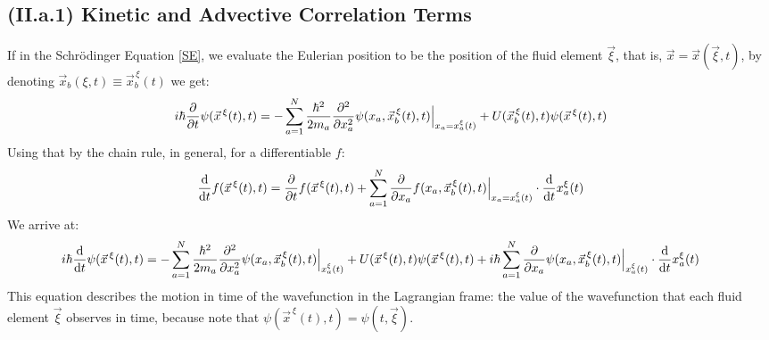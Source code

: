 \documentclass[11pt, a4paper]{article} %
\begin{document}
\subsection*{(II.a.1) Kinetic and Advective Correlation Terms\vspace{-0.2cm}}
If in the Schrödinger Equation \eqref{SE}, we evaluate the Eulerian position to be the position of the fluid element $\vec{\xi}$, that is, $\vec{x}=\vec{x}(\vec{\xi},t)$, by denoting $\vec{x}_b(\xi,t)\equiv \vec{x}_b^{\, \xi}(t)$ we get:
\begin{equation}
i\hbar \pdv{}{t}\psi(\vec{x}^{\, \xi}(t),t)=-\sum_{a=1}^N \frac{\hbar^2}{2m_a}\pdv[2]{}{x_a}\psi(x_a, \vec{x}_b^{\, \xi}(t),t)\Big\rvert_{x_a=x^\xi_a(t)}+U(\vec{x}_b^{\, \xi}(t),t)\psi(\vec{x}^{\, \xi}(t),t)
\end{equation}
Using that by the chain rule, in general, for a differentiable $f$:
\begin{equation}\label{chainRuler}
\dv{}{t}f(\vec{x}^{\, \xi}(t), t)=\pdv{}{t}f(\vec{x}^{\, \xi}(t), t)+\sum_{a=1}^N \pdv{}{x_a}f(x_a,\vec{x}_b^{\, \xi}(t), t)\Big\rvert_{x_a=x^\xi_a(t)}\cdot \dv{}{t}x^\xi_a(t)
\end{equation}
We arrive at:\vspace{-0.1cm}
\begin{equation}\label{KinAdv}
\hspace{-0.6cm}i\hbar \dv{}{t}\psi(\vec{x}^{\, \xi}(t),t)=-\sum_{a=1}^N \frac{\hbar^2}{2m_a}\pdv[2]{}{x_a}\psi(x_a, \vec{x}_b^{\, \xi}(t),t)\Big\rvert_{x^\xi_a(t)}+U(\vec{x}^{\, \xi}(t),t)\psi(\vec{x}^{\, \xi}(t),t)+i\hbar \sum_{a=1}^N  \pdv{}{x_a}\psi(x_a,\vec{x}_b^{\, \xi}(t), t)\Big\rvert_{x^\xi_a(t)}\cdot \dv{}{t}x^\xi_a(t)
\end{equation}
This equation describes the motion in time of the wavefunction in the Lagrangian frame: the value of the wavefunction that each fluid element $\vec{\xi}$ observes in time, because note that $\psi(\vec{x}^{\, \xi}(t),t)=\psi(t, \vec{\xi})$.
\end{document}
